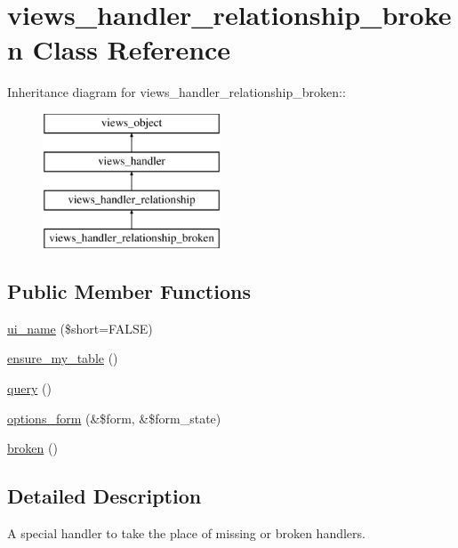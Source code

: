 \hypertarget{classviews__handler__relationship__broken}{
\section{views\_\-handler\_\-relationship\_\-broken Class Reference}
\label{classviews__handler__relationship__broken}
}
Inheritance diagram for views\_\-handler\_\-relationship\_\-broken::\begin{figure}[H]
\begin{center}
\leavevmode
\includegraphics[height=4cm]{classviews__handler__relationship__broken}
\end{center}
\end{figure}
\subsection*{Public Member Functions}
\begin{CompactItemize}
\item 
\hyperlink{classviews__handler__relationship__broken_d6a2ac8a5183f5293745ce27b55ac390}{ui\_\-name} (\$short=FALSE)
\item 
\hyperlink{classviews__handler__relationship__broken_cea2731924b5f5e3b83776f237b3ff67}{ensure\_\-my\_\-table} ()
\item 
\hyperlink{classviews__handler__relationship__broken_58db24781460cd5b36c08c56df9d56ab}{query} ()
\item 
\hyperlink{classviews__handler__relationship__broken_a421a42866d049732e8747669466ae0e}{options\_\-form} (\&\$form, \&\$form\_\-state)
\item 
\hyperlink{classviews__handler__relationship__broken_c4e5826e70953e7ec16f50ec264fdb53}{broken} ()
\end{CompactItemize}


\subsection{Detailed Description}
A special handler to take the place of missing or broken handlers. 

